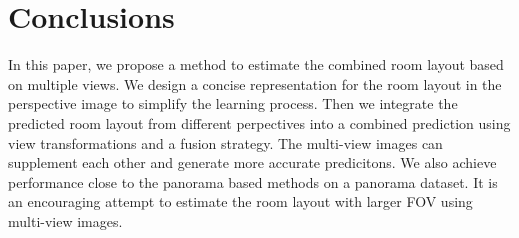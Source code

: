 \section{Conclusions}
In this paper, we propose a method to estimate the combined room layout based on multiple views. We design a concise representation for the room layout in the perspective image to simplify the learning process. Then we integrate the predicted room layout from different perpectives into a combined prediction using view transformations and a fusion strategy. The multi-view images can supplement each other and generate more accurate predicitons. We also achieve performance close to the panorama based methods on a panorama dataset. It is an encouraging attempt to estimate the room layout with larger FOV using multi-view images.


